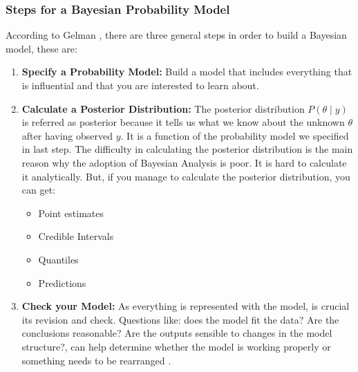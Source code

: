   \subsubsection{Steps for a Bayesian Probability Model}
  According to Gelman \cite{gelman2013bayesian}, there are three general steps in order to build a Bayesian model, these are:
    \begin{enumerate}
    \item \textbf{Specify a Probability Model:} Build a model that includes everything that is influential and that you are interested to learn about.
    \item \textbf{Calculate a Posterior Distribution:} The posterior distribution $P(\theta\mid y)$ is referred as posterior because it tells us what we know about the unknown $\theta$ after having observed $y$. It is a function of the probability model we specified in last step. The difficulty in calculating the posterior distribution is the main reason why the adoption of Bayesian Analysis is poor. It is hard to calculate it analytically. But, if you manage to calculate the posterior distribution, you can get:
    \begin{multicols}{2}
    \begin{itemize}
    \item Point estimates
    \item Credible Intervals
    \item Quantiles
    \item Predictions
    \end{itemize}
    \end{multicols}
    \item \textbf{Check your Model:} As everything is represented with the model, is crucial its revision and check. Questions like: does the model fit the data? Are the conclusions reasonable? Are the outputs sensible to changes in the model structure?, can help determine whether the model is working properly or something needs to be rearranged \cite{youtube1}.
    \end{enumerate}

